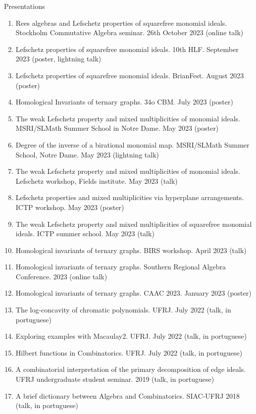 \documentclass{resume} %
\begin{document}
\begin{rSection}{Presentations}
    \begin{enumerate}[label={}]
        \item Rees algebras and Lefschetz properties of squarefree monomial ideals. Stockholm Commutative Algebra seminar. 26th October 2023 (online talk)
        \item Lefschetz properties of squarefree monomial ideals. 10th HLF. September 2023 (poster, lightning talk)
        \item Lefschetz properties of squarefree monomial ideals. BrianFest. August 2023 (poster)
        \item Homological Invariants of ternary graphs. 34o CBM. July 2023 (poster)
        \item The weak Lefschetz property and mixed multiplicities of monomial ideals. MSRI/SLMath Summer School in Notre Dame. May 2023 (poster)
        \item Degree of the inverse of a birational monomial map. MSRI/SLMath Summer School, Notre Dame. May 2023 (lightning talk)
        \item The weak Lefschetz property and mixed multiplicities of monomial ideals. Lefschetz workshop, Fields institute. May 2023 (talk)
        \item Lefschetz properties and mixed multiplicities via hyperplane arrangements. ICTP workshop. May 2023 (poster)
        \item The weak Lefschetz property and mixed multiplicities of squarefree monomial ideals. ICTP summer school. May 2023 (talk)
        \item Homological invariants of ternary graphs. BIRS workshop. April 2023 (talk)
        \item Homological invariants of ternary graphs. Southern Regional Algebra Conference. 2023 (online talk)
        \item Homological invariants of ternary graphs. CAAC 2023. January 2023 (poster)
        \item The log-concavity of chromatic polynomials. UFRJ. July 2022 (talk, in portuguese)
        \item Exploring examples with Macaulay2. UFRJ. July 2022 (talk, in portuguese)
        \item Hilbert functions in Combinatorics. UFRJ. July 2022 (talk, in portuguese)
        \item A combinatorial interpretation of the primary decomposition of edge ideals. UFRJ undergraduate student seminar. 2019 (talk, in portuguese)
        \item A brief dictionary between Algebra and Combinatorics. SIAC-UFRJ 2018 (talk, in portuguese)
    \end{enumerate}
\end{rSection}
\end{document}
